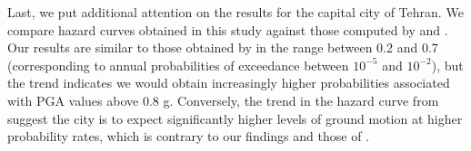 Last, we put additional attention on the results for the capital city of Tehran. We compare hazard curves obtained in this study against those computed by \citet{Ghodrati2003} and \citet{Boostan2015}. Our results are similar to those obtained by \citet{Ghodrati2003} in the range between 0.2 and 0.7 (corresponding to annual probabilities of exceedance between $10^{-5}$ and $10^{-2}$), but the trend indicates we would obtain increasingly higher probabilities associated with PGA values above 0.8 g. Conversely, the trend in the hazard curve from \citet{Boostan2015} suggest the city is to expect significantly higher levels of ground motion at higher probability rates, which is contrary to our findings and those of \citet{Ghodrati2003}.
